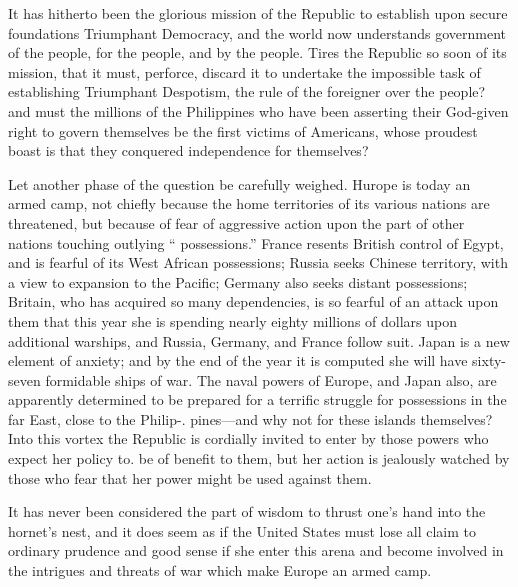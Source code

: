\documentclass[11pt,openany]{book}
\begin{document}
It has hitherto been the glorious mission of the Republic to establish upon secure foundations Triumphant Democracy, and the world now understands government of the people, for the people, and by the people. Tires the Republic so soon of its mission, that it must, perforce, discard it to undertake the impossible task of establishing Triumphant Despotism, the rule of the foreigner over the people? and must the millions of the Philippines who have been asserting their God-given right to govern themselves be the first victims of Americans, whose proudest boast is that they conquered independence for themselves?

Let another phase of the question be carefully weighed. Hurope is today an armed camp, not chiefly because the home territories of its various nations are threatened, but because of fear of aggressive action upon the part of other nations touching outlying `` possessions.'' France resents British control of Egypt, and is fearful of its West African possessions; Russia seeks Chinese territory, with a view to expansion to the Pacific; Germany also seeks distant possessions; Britain, who has acquired so many dependencies, is so fearful of an attack upon them that this year she is spending nearly eighty millions of dollars upon additional warships, and Russia, Germany, and France follow suit. Japan is a new element of anxiety; and by the end of the year it is computed she will have sixty-seven formidable ships of war. The naval powers of Europe, and Japan also, are apparently determined to be prepared for a terrific struggle for possessions in the far East, close to the Philip-. pines---and why not for these islands themselves? Into this vortex the Republic is cordially invited to enter by those powers who expect her policy to. be of benefit to them, but her action is jealously watched by those who fear that her power might be used against them.

It has never been considered the part of wisdom to thrust one's hand into the hornet's nest, and it does seem as if the United States must lose all claim to ordinary prudence and good sense if she enter this arena and become involved in the intrigues and threats of war which make Europe an armed camp.
\end{document}
